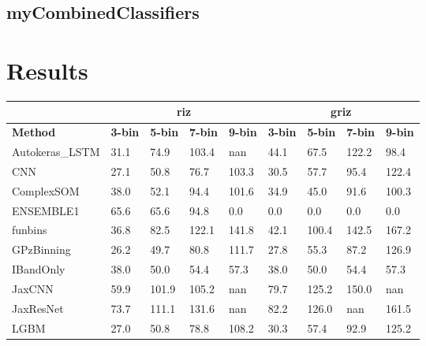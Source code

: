 \documentclass[twocolumn,twocolappendix]{aastex63}
\begin{document}
\subsection{ {\sc myCombinedClassifiers} }



\section{Results}

\begin{table*}[]
\begin{tabular}{l|llll|llll|}
                & \multicolumn{4}{c|}{\textbf{riz}}      & \multicolumn{4}{c|}{\textbf{griz}}                                \\ \hline
\textbf{Method} & \textbf{3-bin} & \textbf{5-bin} & \textbf{7-bin} & \textbf{9-bin} & \textbf{3-bin} & \textbf{5-bin} & \textbf{7-bin} & \textbf{9-bin} \\ \hline
{\sc Autokeras\_LSTM } & 31.1 & 74.9    & 103.4    & nan    & 44.1             & 67.5             & 122.2             & 98.4\\
{\sc CNN } & 27.1 & 50.8    & 76.7    & 103.3    & 30.5             & 57.7             & 95.4             & 122.4\\
{\sc ComplexSOM } & 38.0 & 52.1    & 94.4    & 101.6    & 34.9             & 45.0             & 91.6             & 100.3\\
{\sc ENSEMBLE1 } & 65.6 & 65.6    & 94.8    & 0.0    & 0.0             & 0.0             & 0.0             & 0.0\\
{\sc funbins } & 36.8 & 82.5    & 122.1    & 141.8    & 42.1             & 100.4             & 142.5             & 167.2\\
{\sc GPzBinning } & 26.2 & 49.7    & 80.8    & 111.7    & 27.8             & 55.3             & 87.2             & 126.9\\
{\sc IBandOnly } & 38.0 & 50.0    & 54.4    & 57.3    & 38.0             & 50.0             & 54.4             & 57.3\\
{\sc JaxCNN } & 59.9 & 101.9    & 105.2    & nan    & 79.7             & 125.2             & 150.0             & nan\\
{\sc JaxResNet } & 73.7 & 111.1    & 131.6    & nan    & 82.2             & 126.0             & nan             & 161.5\\
{\sc LGBM } & 27.0 & 50.8    & 78.8    & 108.2    & 30.3             & 57.4             & 92.9             & 125.2\\

\end{tabular}
\end{table*}
\end{document}

